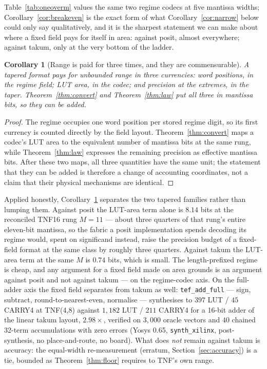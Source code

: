 \documentclass[11pt]{article}
\newtheorem{corollary}{Corollary}
\theoremstyle{definition}
\begin{document}
Table~\ref{tab:oneoverm} values the same two regime codecs at five mantissa
widths; Corollary~\ref{cor:breakeven} is the exact form of what
Corollary~\ref{cor:narrow} below could only say qualitatively, and it is the sharpest
statement we can make about where a fixed field pays for itself in area: against
posit, almost everywhere; against takum, only at the very bottom of the ladder.

\begin{corollary}[Range is paid for three times, and they are commensurable]
\label{cor:three}
A tapered format pays for unbounded range in three currencies: word positions,
in the regime field; LUT area, in the codec; and precision at the extremes, in the
taper. Theorem~\ref{thm:convert} and Theorem~\ref{thm:law} put all three in
mantissa bits, so they can be added.
\end{corollary}
\begin{proof}
The regime occupies one word position per stored regime digit, so its first currency
is counted directly by the field layout. Theorem~\ref{thm:convert} maps a codec's
LUT area to the equivalent number of mantissa bits at the same rung, while
Theorem~\ref{thm:law} expresses the remaining precision as effective mantissa bits.
After these two maps, all three quantities have the same unit; the statement that
they can be added is therefore a change of accounting coordinates, not a claim that
their physical mechanisms are identical.
\end{proof}

Applied honestly, Corollary~\ref{cor:three} separates the two tapered families
rather than lumping them. Against posit the LUT-area term alone is $8.14$ bits at
the reconciled TNF16 rung $M = 11$ --- about three quarters of that rung's entire
eleven-bit mantissa, so the fabric a posit implementation spends decoding its
regime would, spent on significand instead, raise the precision budget of a
fixed-field format at the same class by roughly three quarters. Against takum the
LUT-area term at the same $M$ is $0.74$ bits, which is small. The
length-prefixed regime is cheap, and any argument for a fixed field made on area
grounds is an argument against posit and not against takum --- on the
regime-codec axis. On the full-adder axis the fixed field separates from takum
as well: \texttt{tef\_add\_full} --- sign, subtract, round-to-nearest-even,
normalise --- synthesises to $397$ LUT / $45$ CARRY4 at TNF(4,8) against
$1{,}182$ LUT / $211$ CARRY4 for a 16-bit adder of the linear takum layout,
$2.98\times$, verified on $3{,}000$ oracle vectors and $40$ chained 32-term
accumulations with zero errors (Yosys 0.65, \texttt{synth\_xilinx},
post-synthesis, no place-and-route, no board). What does \emph{not} remain
against takum is accuracy: the equal-width re-measurement (erratum,
Section~\ref{sec:accuracy}) is a tie, bounded as Theorem~\ref{thm:floor}
requires to TNF's own range.
\end{document}
